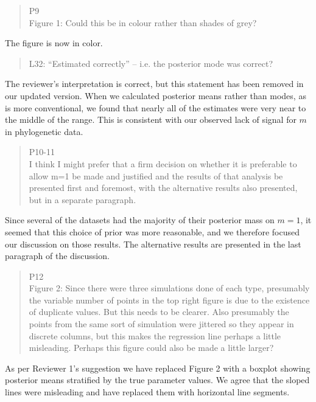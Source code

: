 \documentclass[12pt]{letter}
\begin{document}
\begin{letter}{ }
\begin{quote}
  P9 \\
  Figure 1: Could this be in colour rather than shades of grey?
\end{quote}

The figure is now in color.

\begin{quote}
  \itshape

  L32: ``Estimated correctly'' -- i.e. the posterior mode was correct?
\end{quote}

The reviewer's interpretation is correct, but this statement has been removed
in our updated version. When we calculated posterior means rather than modes,
as is more conventional, we found that nearly all of the estimates were very
near to the middle of the range. This is consistent with our observed lack of
signal for $m$ in phylogenetic data.

\begin{quote}
  \itshape

  P10-11 \\
  I think I might prefer that a firm decision on whether it is preferable to
  allow m=1 be made and justified and the results of that analysis be presented
  first and foremost, with the alternative results also presented, but in a
  separate paragraph.
\end{quote}

Since several of the datasets had the majority of their posterior mass on $m =
1$, it seemed that this choice of prior was more reasonable, and we therefore
focused our discussion on those results. The alternative results are presented
in the last paragraph of the discussion.

\begin{quote}
  \itshape

  P12 \\
  Figure 2: Since there were three simulations done of each type, presumably
  the variable number of points in the top right figure is due to the existence
  of duplicate values. But this needs to be clearer. Also presumably the points
  from the same sort of simulation were jittered so they appear in discrete
  columns, but this makes the regression line perhaps a little misleading.
  Perhaps this figure could also be made a little larger?
\end{quote}

As per Reviewer 1's suggestion we have replaced Figure 2 with a boxplot showing
posterior means stratified by the true parameter values. We agree that the
sloped lines were misleading and have replaced them with horizontal line
segments.


\end{letter}
\end{document}
